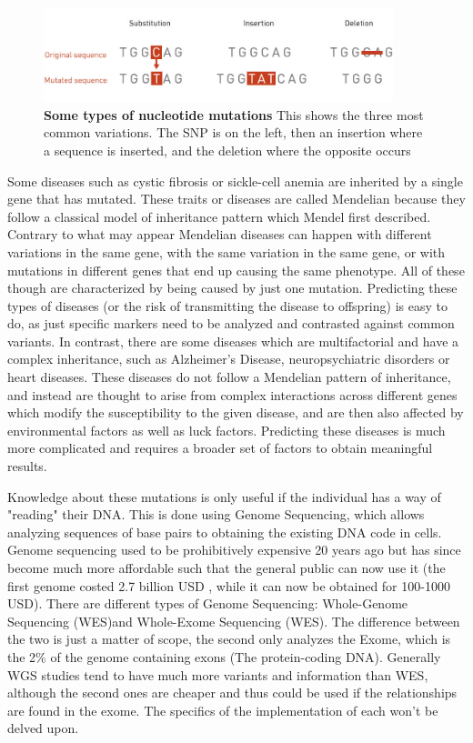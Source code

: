 \begin{figure}[!ht]
\centerline{\includegraphics[width=4in]{images/background/muts.jpg}}
\caption{{\bf Some types of nucleotide mutations\cite{muts}} This shows the three most common variations. The SNP is on the left, then an insertion where a sequence is inserted, and the deletion where the opposite occurs}
\label{genfig2}
\end{figure}

Some diseases such as cystic fibrosis or sickle-cell anemia are inherited by a single gene that has mutated. These traits or diseases are called Mendelian because they follow a classical model of inheritance pattern which Mendel first described. Contrary to what may appear Mendelian diseases can happen with different variations in the same gene, with the same variation in the same gene, or with mutations in different genes that end up causing the same phenotype. All of these though are characterized by being caused by just one mutation. Predicting these types of diseases (or the risk of transmitting the disease to offspring) is easy to do, as just specific markers need to be analyzed and contrasted against common variants.\cite{nussbaum_mcinnes_willard_2016}
\newpage
In contrast, there are some diseases which are multifactorial and have a complex inheritance, such as Alzheimer's Disease, neuropsychiatric disorders or heart diseases. These diseases do not follow a Mendelian pattern of inheritance, and instead are thought to arise from complex interactions across different genes which modify the susceptibility to the given disease, and are then also affected by environmental factors as well as luck factors. Predicting these diseases is much more complicated and requires a broader set of factors to obtain meaningful results.\cite{nussbaum_mcinnes_willard_2016}

Knowledge about these mutations is only useful if the individual has a way of "reading" their DNA. This is done using Genome Sequencing, which allows analyzing sequences of base pairs to obtaining the existing DNA code in cells. Genome sequencing used to be prohibitively expensive 20 years ago but has since become much more affordable such that the general public can now use it (the first genome costed 2.7 billion USD , while it can now be obtained for 100-1000 USD). There are different types of Genome Sequencing: Whole-Genome Sequencing (WES)and Whole-Exome Sequencing (WES). The difference between the two is just a matter of scope, the second only analyzes the Exome, which is the 2\% of the genome containing exons (The protein-coding DNA). Generally WGS studies tend to have much more variants and information than WES, although the second ones are cheaper and thus could be used if the relationships are found in the exome. The specifics of the implementation of each won't be delved upon.



